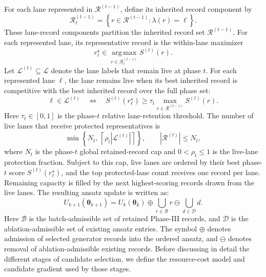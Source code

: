 \documentclass[
  reprint,
  amsmath,
  amssymb,
  aps,
  pra,
  nofootinbib,
  superscriptaddress,
  floatfix
]{revtex4-2}
\begin{document}
For each lane represented in \(\mathcal R^{(t-1)}\), define its inherited
record component by
\begin{equation*}
\mathcal R_{\ell}^{(t-1)}
=
\left\{
r\in\mathcal R^{(t-1)}
:
\lambda(r)=\ell
\right\}.
\end{equation*}
These lane-record components partition the inherited record set
\(\mathcal R^{(t-1)}\). For each represented lane, its representative record is
the within-lane maximizer
\[
r_{\ell}^{\star}
\in
\operatorname*{arg\,max}_{r\in\mathcal R_{\ell}^{(t-1)}}
S^{(t)}(r).
\]
Let \(\mathcal L^{(t)}\subseteq\mathcal L\) denote the lane labels that remain
live at phase \(t\). For each represented lane \(\ell\), the lane remains live
when its best inherited record is competitive with the best inherited record
over the full phase set:
\begin{equation}
\ell\in\mathcal L^{(t)}
\quad\Longleftrightarrow\quad
S^{(t)}(r_{\ell}^{\star})
\ge
\tau_t
\max_{r\in\mathcal R^{(t-1)}}S^{(t)}(r).
\label{eq:phase_restriction_map}
\end{equation}
Here \(\tau_t\in[0,1]\) is the phase-\(t\) relative lane-retention threshold. The
number of live lanes that receive protected representatives is
\begin{equation}
\min\left\{
N_t,\,
\left\lceil \rho_t|\mathcal L^{(t)}|\right\rceil
\right\},
\qquad
|\mathcal R^{(t)}|\le N_t ,
\label{eq:phase_lane_budget}
\end{equation}
where \(N_t\) is the phase-\(t\) global retained-record cap and
\(0<\rho_t\le 1\) is the live-lane protection fraction. Subject to this cap,
live lanes are ordered by their best phase-\(t\) score
\(S^{(t)}(r_{\ell}^{\star})\), and the top protected-lane count receives one
record per lane. Remaining capacity is filled by the next highest-scoring records
drawn from the live lanes.
The resulting ansatz update is written as:
%
\begin{equation*}
U_{k+1}(\boldsymbol\theta_{k+1})
=
U_k(\boldsymbol\theta_k)
\oplus
\bigcup_{r\in\mathcal B} r
\ominus
\bigcup_{d\in\mathcal D} d .
\end{equation*}
%
Here $\mathcal B$ is the batch-admissible set of retained Phase-III records, and $\mathcal D$ is the ablation-admissible set of existing ansatz entries. The symbol \(\oplus\) denotes admission of selected generator records into the ordered ansatz, and \(\ominus\) denotes removal of ablation-admissible existing records. Before discussing in detail the different stages of candidate selection, we define the resource-cost model and candidate gradient used by those stages.
\end{document}
